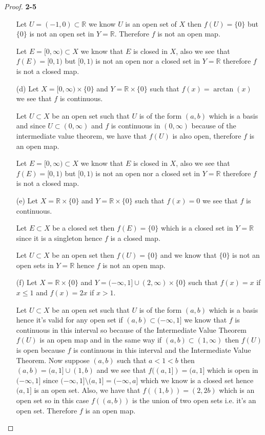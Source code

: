 \documentclass[11pt]{article}
\newcommand{\R}{\mathbb{R}}
\theoremstyle{definition}
\begin{document}
\begin{proof}{\textbf{2-5}}
\begin{itemize}
    Let $U = (-1,0) \subset \R$ we know $U$ is an open set of $X$ then
    $f(U) =\{0\}$  but $\{0\}$ is not an open set in $Y = \R$. Therefore $f$
    is not an open map.

    Let $E = [0, \infty) \subset X$ we know that $E$ is closed in $X$, also we
    see that $f(E) = [0,1)$ but $[0,1)$ is not an open nor a closed set in
    $Y = \R$ therefore $f$ is not a closed map.

    \item [(d)] Let $X = [0,\infty) \times \{0\}$ and $Y = \R \times \{0\}$
    such that $f(x) = \arctan(x)$ we see that $f$ is continuous.

    Let $U \subset X$ be an open set such that $U$ is of the form $(a,b)$
    which is a basis and
    since $U\subset (0, \infty)$ and $f$ is continuous in $(0, \infty)$ because
    of the intermediate value theorem, we have that $f(U)$ is also open,
    therefore $f$ is an open map. 

    Let $E = [0, \infty) \subset X$ we know that $E$ is closed in $X$, also we
    see that $f(E) = [0,1)$ but $[0,1)$ is not an open nor a closed set in
    $Y = \R$ therefore $f$ is not a closed map.

    \item [(e)] Let $X = \R\times\{0\}$ and $Y = \R\times \{0\}$ such
    that $f(x) = 0$ we see that $f$ is continuous.

    Let $E \subset X$ be a closed set then $f(E) = \{0\}$ which is a closed
    set in $Y = \R$ since it is a singleton hence $f$ is a closed map.

    Let $U \subset X$ be an open set then $f(U) = \{0\}$ and we know
    that $\{0\}$ is not an open sets in $Y = \R$ hence $f$ is not an open map.

\cleardoublepage
    \item [(f)] Let $X = \R\times\{0\}$ and
    $Y = (-\infty, 1] \cup (2, \infty)\times \{0\}$ such
    that $f(x) = x$ if $x \leq 1$ and $f(x) = 2x$ if $x > 1$.

    Let $U \subset X$ be an open set such that $U$ is of the form $(a,b)$ which
    is a basis hence it's valid for any open set if
    $(a,b) \subset (-\infty, 1]$ we know that $f$ is continuous
    in this interval so because of the Intermediate Value Theorem $f(U)$
    is an open map and in the same way if
    $(a,b) \subset (1, \infty)$ then $f(U)$ is open because $f$ is continuous
    in this interval and the Intermediate Value Theorem.
    Now suppose $(a,b)$ such that $a < 1 < b$ then
    $(a,b) = (a, 1] \cup (1, b)$ and we see that $f((a, 1]) = (a, 1]$ which is
    open in $(-\infty, 1]$ since $(-\infty, 1] \setminus (a, 1] = (-\infty, a]$
    which we know is a closed set hence $(a, 1]$ is an open set.
    Also, we have that $f((1, b)) = (2, 2b)$ which is an open set so in this
    case $f((a,b))$ is the union of two open sets i.e. it's an open set.
    Therefore $f$ is an open map.


\end{itemize}
\end{proof}
\end{document}
